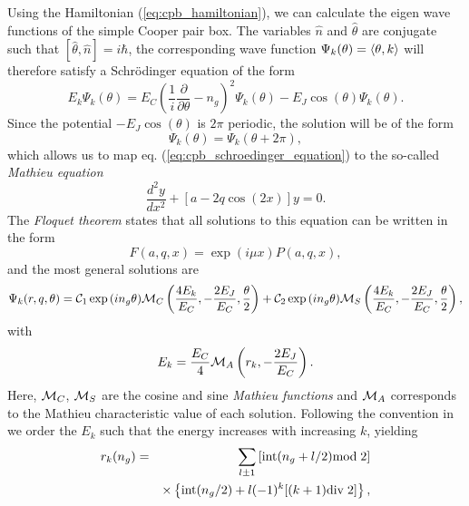 Using the Hamiltonian (\ref{eq:cpb_hamiltonian}), we can calculate the eigen wave functions of the simple Cooper pair box. The variables $\hat{n}$ and $\hat{\theta}$ are conjugate such that $[\hat{\theta},\hat{n}]=i\hbar$, the corresponding wave function $\Psi_k(\theta) = \left< \theta,k \right>$ will therefore satisfy a Schrödinger equation of the form
%
\begin{equation}
E_k \Psi_k(\theta) = E_C(\frac{1}{i}\frac{\partial}{\partial \theta}-n_g)^2 \Psi_k(\theta) - E_J \cos{\left(\theta\right)}\Psi_k(\theta). \label{eq:cpb_schroedinger_equation}
\end{equation}
%
Since the potential $-E_J\cos{(\theta)}$ is $2\pi$ periodic, the solution will be of the form
%
\begin{equation}
\Psi_k(\theta) = \Psi_k(\theta+2\pi),
\end{equation}
%
which allows us to map eq. (\ref{eq:cpb_schroedinger_equation}) to the so-called {\it Mathieu  equation}
%
\begin{equation}
\frac{d^2y}{dx^2}+\left[a-2q\cos{(2x)}\right]y = 0.
\end{equation}
%
The {\it Floquet theorem} states that all solutions to this equation can be written in the form
%
\begin{equation}
F(a,q,x) = \exp{\left(i\mu x\right)}P(a,q,x),
\end{equation}
%
and the most general solutions are \citep{cottet_implementation_2002}
%
\begin{equation}
\Psi_k(r,q,\theta) = \mcal{C}_1\exp{\left(i n_g \theta \right)}\mcal{M}_C\left(\frac{4E_k}{E_C},-\frac{2E_J}{E_C},\frac{\theta}{2}\right)+\mcal{C}_2\exp{\left(i n_g \theta \right)}\mcal{M}_S \left(\frac{4 E_k}{E_C},-\frac{2 E_J}{E_C},\frac{\theta}{2}\right),
\end{equation}
%
with 
%
\begin{equation}
E_k = \frac{E_C}{4}\mcal{M}_A \left(r_k,-\frac{2 E_J}{E_C} \right).
\end{equation}
%
Here, $\mcal{M}_C$, $\mcal{M}_S$ are the cosine and sine {\it Mathieu functions} and $\mcal{M}_A$ corresponds to the Mathieu characteristic value of each solution. Following the convention in \citep{cottet_implementation_2002} we order the $E_k$ such that the energy increases with increasing $k$, yielding \citep{koch_charge-insensitive_2007}
%
\begin{eqnarray}
r_k(n_g) & = & \sum\limits_{l\pm 1}\left[\mathrm{int}(n_g+l/2)\mathrm{mod}\;2\right] \notag \\
&  & \times\left\{\mathrm{int}(n_g/2)+l(-1)^k[(k+1)\mathrm{div}\;2]\right\},
\end{eqnarray}
